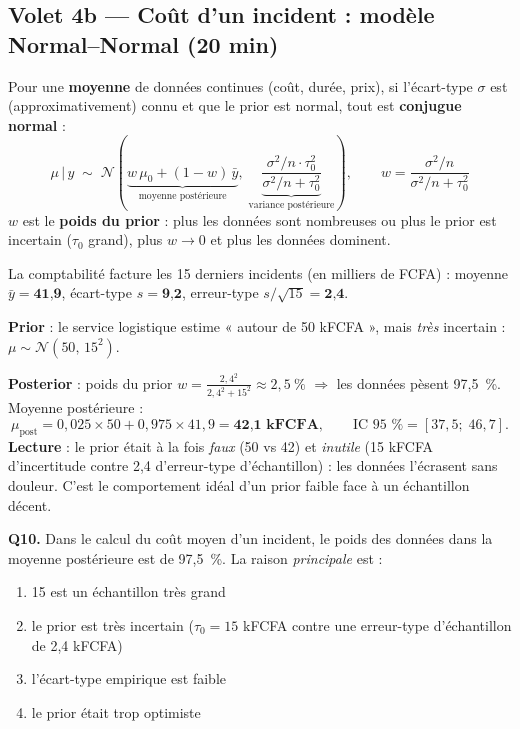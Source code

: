 \documentclass[11pt,a4paper]{article}
\newcommand{\given}{\,\vert\,}
\begin{document}
\subsection{Volet 4b --- Coût d'un incident : modèle Normal--Normal (20 min)}

\begin{rappel}
Pour une \textbf{moyenne} de données continues (coût, durée, prix), si l'écart-type
$\sigma$ est (approximativement) connu et que le prior est normal, tout est
\textbf{conjugue normal} :
\[
\mu \given y \;\sim\; \mathcal{N}\!\left(
\underbrace{w\,\mu_0 + (1-w)\,\bar y}_{\text{moyenne postérieure}},\;
\underbrace{\frac{\sigma^2/n \cdot \tau_0^2}{\sigma^2/n + \tau_0^2}}_{\text{variance postérieure}}
\right), \qquad
w = \frac{\sigma^2/n}{\sigma^2/n + \tau_0^2}
\]
$w$ est le \textbf{poids du prior} : plus les données sont nombreuses ou plus le
prior est incertain ($\tau_0$ grand), plus $w \to 0$ et plus les données dominent.
\end{rappel}

\begin{application}
La comptabilité facture les 15 derniers incidents (en milliers de FCFA) :
moyenne $\bar y = \textbf{41,9}$, écart-type $s = \textbf{9,2}$,
erreur-type $s/\sqrt{15} = \textbf{2,4}$.

\textbf{Prior} : le service logistique estime « autour de 50 kFCFA », mais
\emph{très} incertain : $\mu \sim \mathcal{N}(50,\, 15^2)$.

\textbf{Posterior} : poids du prior $w = \frac{2{,}4^2}{2{,}4^2 + 15^2} \approx 2{,}5~\%$
$\Rightarrow$ les données pèsent 97,5~\%. Moyenne postérieure :
\[
\mu_{\text{post}} = 0{,}025 \times 50 + 0{,}975 \times 41{,}9 = \textbf{42,1 kFCFA},
\qquad \text{IC 95~\%} = [37{,}5;\; 46{,}7].
\]
\textbf{Lecture} : le prior était à la fois \emph{faux} (50 vs 42) et
\emph{inutile} (15 kFCFA d'incertitude contre 2,4 d'erreur-type d'échantillon) :
les données l'écrasent sans douleur. C'est le comportement idéal d'un prior
faible face à un échantillon décent.
\end{application}

\begin{qcmbox}[Question 10]
\textbf{Q10.} Dans le calcul du coût moyen d'un incident, le poids des données
dans la moyenne postérieure est de 97,5~\%. La raison \emph{principale} est :
\begin{enumerate}[label=\Alph*.), leftmargin=8mm, itemsep=0.3mm]
  \item 15 est un échantillon très grand
  \item le prior est très incertain ($\tau_0 = 15$ kFCFA contre une erreur-type
        d'échantillon de 2,4 kFCFA)
  \item l'écart-type empirique est faible
  \item le prior était trop optimiste
\end{enumerate}
\end{qcmbox}
\end{document}
